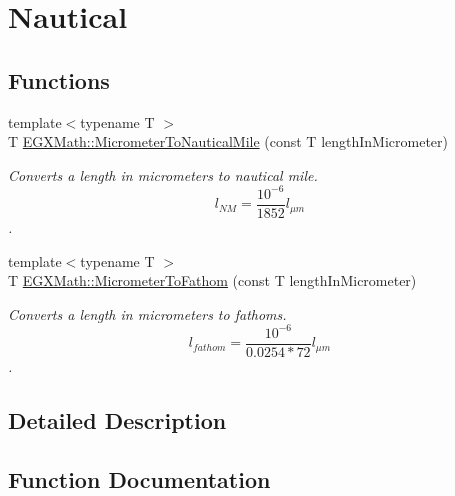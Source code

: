 \hypertarget{group___e_g_x_math-_conversions-_length_conversions-_s_i-_micrometer-_nautical}{}\section{Nautical}
\label{group___e_g_x_math-_conversions-_length_conversions-_s_i-_micrometer-_nautical}
\subsection*{Functions}
\begin{DoxyCompactItemize}
\item 
{\footnotesize template$<$typename T $>$ }\\T \mbox{\hyperlink{group___e_g_x_math-_conversions-_length_conversions-_s_i-_micrometer-_nautical_ga43c5eb76a19baf316e06b38781369157}{E\+G\+X\+Math\+::\+Micrometer\+To\+Nautical\+Mile}} (const T length\+In\+Micrometer)
\begin{DoxyCompactList}\small\item\em Converts a length in micrometers to nautical mile. \[ l_{NM}= \frac{10^{-6}}{1852} l_{\mu m} \]. \end{DoxyCompactList}\item 
{\footnotesize template$<$typename T $>$ }\\T \mbox{\hyperlink{group___e_g_x_math-_conversions-_length_conversions-_s_i-_micrometer-_nautical_gad7205d8bf0d8735b12fc0b03c67cf0f7}{E\+G\+X\+Math\+::\+Micrometer\+To\+Fathom}} (const T length\+In\+Micrometer)
\begin{DoxyCompactList}\small\item\em Converts a length in micrometers to fathoms. \[ l_{fathom}= \frac{10^{-6}}{0.0254 * 72} l_{\mu m} \]. \end{DoxyCompactList}\end{DoxyCompactItemize}


\subsection{Detailed Description}


\subsection{Function Documentation}
\mbox{\label{group___e_g_x_math-_conversions-_length_conversions-_s_i-_micrometer-_nautical_gad7205d8bf0d8735b12fc0b03c67cf0f7}} 
